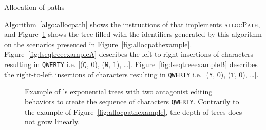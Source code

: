 
\begin{algorithm}

\caption{\label{algo:allocpath}Allocation of paths}
\end{algorithm}

Algorithm~\ref{algo:allocpath} shows the instructions of \LSEQ that implements
\textsc{allocPath}, and Figure~\ref{fig:lseqtreeexample} shows the tree filled
with the identifiers generated by this algorithm on the scenarios presented in
Figure~\ref{fig:allocpathexample}. Figure~\ref{fig:lseqtreeexampleA} describes
the left-to-right insertions of characters resulting in \texttt{QWERTY}
i.e. [($\texttt{Q},\,0$), ($\texttt{W},\,1$),
\ldots]. Figure~\ref{fig:lseqtreeexampleB} describes the right-to-left
insertions of characters resulting in \texttt{QWERTY} i.e.  [($\texttt{Y},\,0$),
($\texttt{T},\,0$), \ldots].

\begin{figure}
  \centering
  \caption{\label{fig:lseqtreeexample} Example of \LSEQ's exponential trees with
    two antagonist editing behaviors to create the sequence of characters
    \texttt{QWERTY}. Contrarily to the example of
    Figure~\ref{fig:allocpathexample}, the depth of trees does not grow
    linearly.}
\end{figure}


